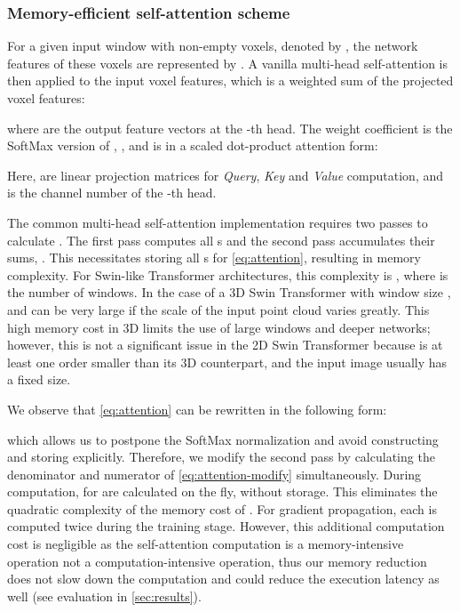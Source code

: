 \documentclass[10pt,twocolumn,letterpaper]{article}
\begin{document}
\subsubsection{Memory-efficient self-attention scheme}

For a given input window with  non-empty voxels, denoted by , the network features of these voxels are represented by . A vanilla multi-head self-attention is then applied to the input voxel features, which is a weighted sum of the projected voxel features:

 where  are the output feature vectors at the -th head. The weight coefficient  is the SoftMax version of , \ie , and  is in a scaled dot-product attention form:
 
Here,  are linear projection matrices for \emph{Query}, \emph{Key} and \emph{Value} computation, and  is the channel number of the -th head.

The common multi-head self-attention implementation requires two passes to calculate . The first pass computes all s and the second pass accumulates their sums, \ie . This necessitates storing all s for \cref{eq:attention}, resulting in  memory complexity. For Swin-like Transformer architectures, this complexity is , where  is the number of windows. In the case of a 3D Swin Transformer with window size ,  and  can be very large if the scale of the input point cloud varies greatly. This high memory cost in 3D limits the use of large windows and deeper networks; however, this is not a significant issue in the 2D Swin Transformer because  is at least one order smaller than its 3D counterpart, and the input image usually has a fixed size.

We observe that \cref{eq:attention} can be rewritten in the following form:

which allows us to postpone the SoftMax normalization and avoid constructing and storing  explicitly. Therefore, we modify the second pass by calculating the denominator and numerator of \cref{eq:attention-modify} simultaneously. During computation,  for  are calculated on the fly, without storage. This eliminates the quadratic complexity of the memory cost of . For gradient propagation, each  is computed twice during the training stage. However, this additional computation cost is negligible as the self-attention computation is a memory-intensive operation not a computation-intensive operation, thus our memory reduction does not slow down the computation and could reduce the execution latency as well (see evaluation in \cref{sec:results}).
\end{document}
